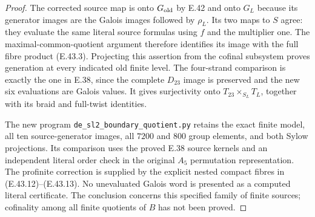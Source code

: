 \begin{proof}
The corrected source map is onto
$G_{\rm old}$ by E.42 and onto
$G_L$ because its generator images
are the Galois images followed by
$\rho_L$.  Its two maps to $S$
agree: they evaluate the same
literal source formulas using $f$
and the multiplier one.
The maximal-common-quotient argument
therefore identifies its image with
the full fibre product
\textup{(E.43.3)}.
Projecting this assertion from the
cofinal subsystem proves generation
at every indicated old finite level.
The four-strand comparison is exactly
the one in E.38, since the complete
$D_{23}$ image is preserved and the
new six evaluations are Galois values.
It gives surjectivity onto
$T_{23}\times_{S_L}T_L$, together
with its braid and full-twist identities.

The new program
\texttt{de\_sl2\_boundary\_quotient.py}
retains the exact finite model, all
ten source-generator images, all
$7200$ and $800$ group elements,
and both Sylow projections.
Its comparison uses the proved
E.38 source kernels and an independent
literal order check in the original
$A_5$ permutation representation.
The profinite correction is supplied
by the explicit nested compact fibres
in \textup{(E.43.12)--(E.43.13)}.
No unevaluated Galois word is presented
as a computed literal certificate.
The conclusion concerns this specified
family of finite sources; cofinality
among all finite quotients of $B$
has not been proved.
\end{proof}
